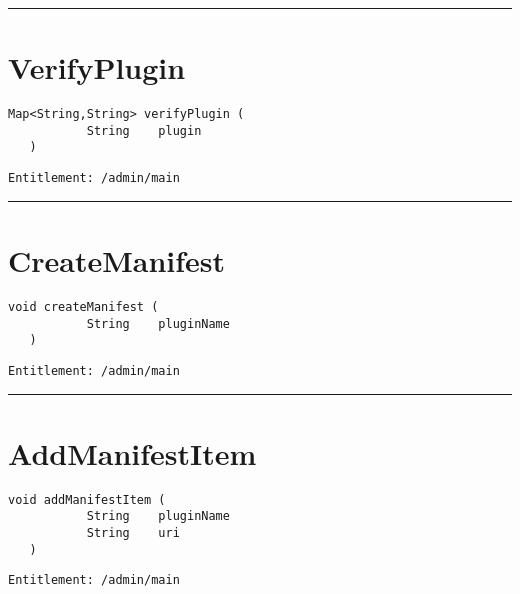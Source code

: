 \rule{12cm}{2pt}
\section{VerifyPlugin}
\label{Api:VerifyPlugin}
\begin{lstlisting}[style=nonumbers]
   Map<String,String> verifyPlugin (
           String    plugin
   )
\end{lstlisting}
\begin{Verbatim}[formatcom=\color{Maroon}]
  Entitlement: /admin/main
\end{Verbatim}



\rule{12cm}{2pt}
\section{CreateManifest}
\label{Api:CreateManifest}
\begin{lstlisting}[style=nonumbers]
   void createManifest (
           String    pluginName
   )
\end{lstlisting}
\begin{Verbatim}[formatcom=\color{Maroon}]
  Entitlement: /admin/main
\end{Verbatim}



\rule{12cm}{2pt}
\section{AddManifestItem}
\label{Api:AddManifestItem}
\begin{lstlisting}[style=nonumbers]
   void addManifestItem (
           String    pluginName
           String    uri
   )
\end{lstlisting}
\begin{Verbatim}[formatcom=\color{Maroon}]
  Entitlement: /admin/main
\end{Verbatim}



